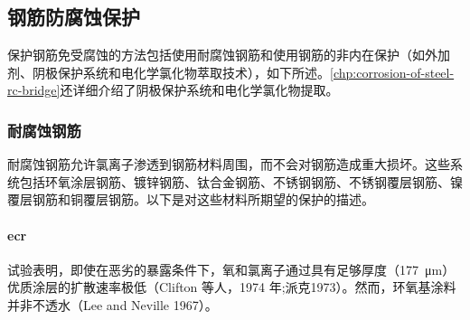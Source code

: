\subsection{钢筋防腐蚀保护}
\label{subsec:protection-reinforcing-steel}
保护钢筋免受腐蚀的方法包括使用耐腐蚀钢筋和使用钢筋的非内在保护（如外加剂、阴极保护系统和电化学氯化物萃取技术），如下所述。\cref{chp:corrosion-of-steel-rc-bridge}还详细介绍了阴极保护系统和电化学氯化物提取。

\subsubsection{耐腐蚀钢筋}
耐腐蚀钢筋允许氯离子渗透到钢筋材料周围，而不会对钢筋造成重大损坏。这些系统包括环氧涂层钢筋、镀锌钢筋、钛合金钢筋、不锈钢钢筋、不锈钢覆层钢筋、镍覆层钢筋和铜覆层钢筋。以下是对这些材料所期望的保护的描述。

\paragraph{\acrfull*{ecr}}
试验表明，即使在恶劣的暴露条件下，氧和氯离子通过具有足够厚度（\qty{177}{\micro m}）优质涂层的扩散速率极低（Clifton 等人，1974 年;派克1973）。然而，环氧基涂料并非不透水（Lee and Neville 1967）。

